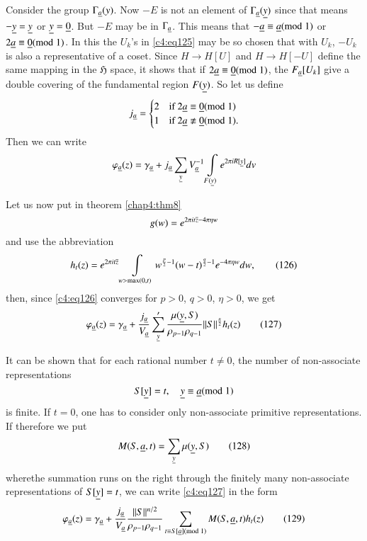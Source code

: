 Consider the group $\Gamma_{\underline{a}}(y)$. Now $-E$ is not an element of
$\Gamma_{\underline{a}}(\underline{y})$ since that means $-\underline{y}=\underline{y}$ or
$\underline{y}=\underline{0}$. But $-E$ may be in\pageoriginale
$\Gamma_{\underline{a}}$. This means that $-\underline{a}\equiv \underline{a}(\rm{mod} \; 1)$ or
$2\underline{a}\equiv\underline{0}(\rm{mod} \; 1)$. In this the $U_{k}$'s in \eqref{c4:eq125}
may be so chosen that with $U_{k}$, $-U_{k}$ is also a representative
of a coset. Since $H\to H[U]$ and $H\to H[-U]$ define the same mapping
in the $\mathfrak{H}$ space, it shows that if
$2\underline{a}\equiv\underline{0}(\rm{mod} \; 1)$, the $F_{\underline{a}}[U_{k}]$ give a double
covering of the fundamental region $F(\underline{y})$. So let us define
$$
j_{\underline{a}}=
\begin{cases}
2 & \text{if } 2\underline{a}\equiv\underline{0}(\rm{mod} \; 1)\\
1 & \text{if } 2\underline{a}\not\equiv \underline{0}(\rm{mod} \; 1).
\end{cases}
$$
Then we can write
$$
\varphi_{\underline{a}}(z)=\gamma_{\underline{a}}+j_{\underline{a}}\sum_{\underline{y}}V^{-1}_{\underline{a}}\int\limits_{F(\underline{y})}e^{2\pi
  iR[\underline{y}]}dv
$$

Let us now put in theorem \ref{chap4:thm8}
$$
g(w)=e^{2\pi it\overline{z}-4\pi \eta w}
$$
and use the abbreviation
\begin{equation*}
h_{t}(z)=e^{2\pi it\overline{z}}\int\limits_{w>\max
  (0,t)}w^{\frac{p}{2}-1}(w-t)^{\frac{q}{2}-1}e^{-4\pi \eta
  w}dw,\tag{126}\label{c4:eq126} 
\end{equation*}
then, since \eqref{c4:eq126} converges for $p>0$, $q>0$, $\eta>0$, we get
\begin{equation*}
\varphi_{\underline{a}}(z)=\gamma_{\underline{a}}+\frac{j_{\underline{a}}}{V_{\underline{a}}}\sum'_{\underline{y}}\frac{\mu(\underline{y},S)}{\rho_{p-1}\rho_{q-1}}||S||^{\frac{n}{2}}h_{t}(z)\tag{127}\label{c4:eq127} 
\end{equation*}

It can be shown that for each rational number $t\neq 0$, the number of
non-associate representations
$$
S[\underline{y}]=t,\quad \underline{y}\equiv \underline{a}(\rm{mod} \; 1)
$$
is finite. If $t=0$, one has to consider only non-associate primitive
representations. If therefore we put
\begin{equation*}
M(S,\underline{a},t)=\sum_{\underline{y}}\mu(\underline{y},S)\tag{128}\label{c4:eq128}
\end{equation*}
where\pageoriginale the summation runs on the right through the
finitely many non-associate representations of $S[\underline{y}]=t$, we can
write \eqref{c4:eq127} in the form
\begin{equation*}
\varphi_{\underline{a}}(z)=\gamma_{\underline{a}}+\frac{j_{\underline{a}}}{V_{\underline{a}}}\frac{||S||^{n/2}}{\rho_{p-1}\rho_{q-1}}\sum_{t\equiv S[\underline{a}](\rm{mod} \; 1)}M(S,\underline{a},t)h_{t}(z)\tag{129}\label{c4:eq129}
\end{equation*}

